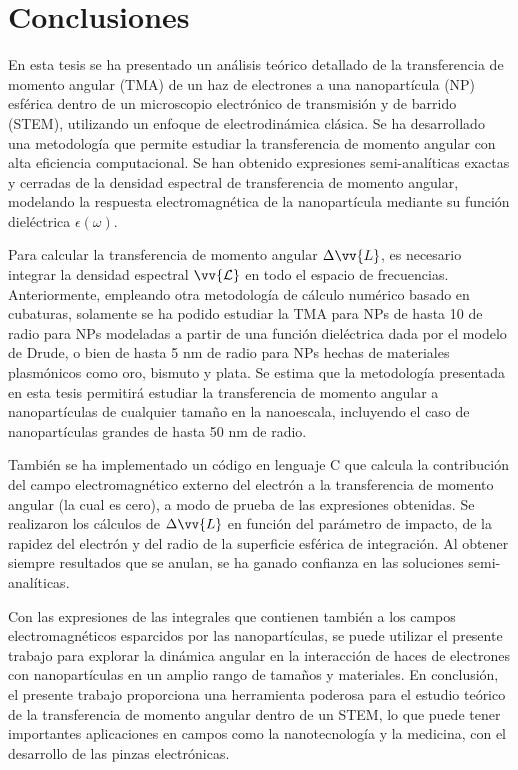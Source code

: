 
\label{conclusiones}

\section{Conclusiones}

En esta tesis se ha presentado un análisis teórico detallado de la transferencia de momento angular (TMA) de un haz de electrones a una nanopartícula (NP) esférica dentro de un microscopio electrónico de transmisión y de barrido (STEM), utilizando un enfoque de electrodinámica clásica. Se ha desarrollado una metodología que permite estudiar la transferencia de momento angular con alta eficiencia computacional. Se han obtenido expresiones semi-analíticas exactas y cerradas de la densidad espectral de transferencia de momento angular, modelando la respuesta electromagnética de la nanopartícula mediante su función dieléctrica $\epsilon(\omega)$.

Para calcular la transferencia de momento angular $\Delta \vv{L}$, es necesario integrar la densidad espectral $\vv{\mathcal{L}}$ en todo el espacio de frecuencias. Anteriormente, empleando otra metodología de cálculo numérico basado en cubaturas, solamente se ha podido estudiar la TMA para NPs de hasta 10 de radio para NPs modeladas a partir de una función dieléctrica dada por el modelo de Drude, o bien de hasta 5 nm de radio para NPs hechas de materiales plasmónicos como oro, bismuto y plata. Se estima que la metodología presentada en esta tesis permitirá estudiar la transferencia de momento angular a nanopartículas de cualquier tamaño en la nanoescala, incluyendo el caso de nanopartículas grandes de hasta 50 nm de radio. 

También se ha implementado un código en lenguaje C que calcula la contribución del campo electromagnético externo del electrón a la transferencia de momento angular (la cual es cero), a modo de prueba de las expresiones obtenidas. Se realizaron los cálculos de $\Delta \vv{L}$ en función del parámetro de impacto, de la rapidez del electrón y del radio de la superficie esférica de integración. Al obtener siempre resultados que se anulan, se ha ganado confianza en las soluciones semi-analíticas.

Con las expresiones de las integrales que contienen también a los campos electromagnéticos esparcidos por las nanopartículas, se puede utilizar el presente trabajo para explorar la dinámica angular en la interacción de haces de electrones con nanopartículas en un amplio rango de tamaños y materiales. En conclusión, el presente trabajo proporciona una herramienta poderosa para el estudio teórico de la transferencia de momento angular dentro de un STEM, lo que puede tener importantes aplicaciones en campos como la nanotecnología y la medicina, con  el desarrollo de las pinzas electrónicas.

